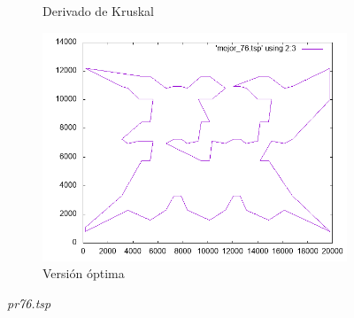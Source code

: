 \documentclass[12pt,spanish]{article}
\begin{document}
\begin{figure}[H]
\begin{subfigure}[b]{0.36\textwidth}
\caption{Derivado de Kruskal}
\end{subfigure}
\quad
\begin{subfigure}[b]{0.36\textwidth}
\includegraphics[width=\textwidth]{pr76_mejor.png}
\caption{Versión óptima}
\end{subfigure}
\caption{\textit{pr76.tsp}}
\end{figure}
\end{document}

